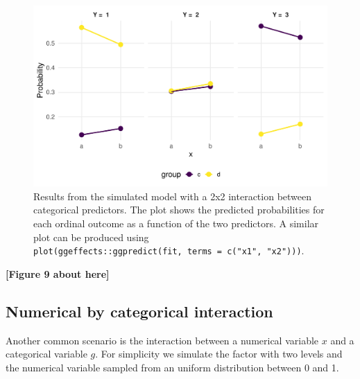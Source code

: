 \documentclass[
  man,floatsintext]{apa6}
\begin{document}
\scriptsize

\begin{figure}

{\centering \includegraphics[width=1\linewidth]{paper_files/figure-latex/fig-effects-2-by-2-interaction-1} 

}

\caption{Results from the simulated model with a 2x2 interaction between categorical predictors. The plot shows the predicted probabilities for each ordinal outcome as a function of the two predictors. A similar plot can be produced using \texttt{plot(ggeffects::ggpredict(fit,\ terms\ =\ c("x1",\ "x2")))}.}\label{fig:fig-effects-2-by-2-interaction}
\end{figure}

\begin{center}\textbf{[Figure 9 about here]} \end{center}

\normalsize

\subsection{Numerical by categorical interaction}\label{numerical-by-categorical-interaction}

Another common scenario is the interaction between a numerical variable \(x\) and a categorical variable \(g\). For simplicity we simulate the factor with two levels and the numerical variable sampled from an uniform distribution between 0 and 1.

\scriptsize
\end{document}
